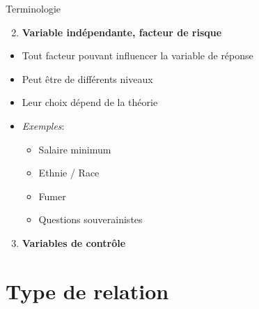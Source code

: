 \documentclass[ignorenonframetext,]{beamer}
\providecommand{\tightlist}{%
  \setlength{\itemsep}{0pt}\setlength{\parskip}{0pt}}
\begin{document}
\begin{frame}{Terminologie}
\protect\hypertarget{terminologie-1}{}

\begin{enumerate}
\setcounter{enumi}{1}
\tightlist
\item
  \textbf{Variable indépendante, facteur de risque}
\end{enumerate}

\begin{itemize}
\tightlist
\item
  Tout facteur pouvant influencer la variable de réponse
\item
  Peut être de différents niveaux
\item
  Leur choix dépend de la théorie
\item
  \emph{Exemples}:

  \begin{itemize}
  \tightlist
  \item
    Salaire minimum
  \item
    Ethnie / Race
  \item
    Fumer
  \item
    Questions souverainistes
  \end{itemize}
\end{itemize}

\begin{enumerate}
\setcounter{enumi}{2}
\tightlist
\item
  \textbf{Variables de contrôle}
\end{enumerate}

\end{frame}

\hypertarget{type-de-relation}{%
\section{Type de relation}\label{type-de-relation}}
\end{document}
